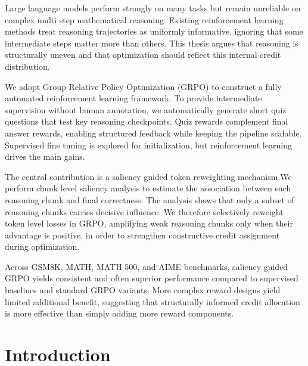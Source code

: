 \documentclass[12pt]{report}
\begin{document}
\vspace{1cm}

\begingroup
\setlength{\parindent}{0pt}
\setlength{\parskip}{0.6em} %
Large language models perform strongly on many tasks but remain unreliable on complex multi step mathematical reasoning. Existing reinforcement learning methods treat reasoning trajectories as uniformly informative, ignoring that some intermediate steps matter more than others. This thesis argues that reasoning is structurally uneven and that optimization should reflect this internal credit distribution.

We adopt Group Relative Policy Optimization (GRPO) to construct a fully automated reinforcement learning framework. To provide intermediate supervision without human annotation, we automatically generate short quiz questions that test key reasoning checkpoints. Quiz rewards complement final answer rewards, enabling structured feedback while keeping the pipeline scalable. Supervised fine tuning is explored for initialization, but reinforcement learning drives the main gains.

The central contribution is a saliency guided token reweighting mechanism.We perform chunk level saliency analysis to estimate the association between each reasoning chunk and final correctness. The analysis shows that only a subset of reasoning chunks carries decisive influence. We therefore selectively reweight token level losses in GRPO, amplifying weak reasoning chunks only when their advantage is positive, in order to strengthen constructive credit assignment during optimization.

Across GSM8K, MATH, MATH 500, and AIME benchmarks, saliency guided GRPO yields consistent and often superior performance compared to supervised baselines and standard GRPO variants. More complex reward designs yield limited additional benefit, suggesting that structurally informed credit allocation is more effective than simply adding more reward components.
\endgroup

\clearpage

\tableofcontents


\clearpage
{}
\setcounter{page}{1}

\chapter{Introduction}
\end{document}
